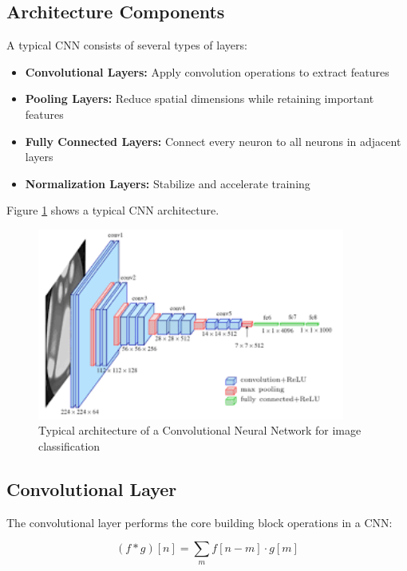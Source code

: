 \documentclass[11pt,a4paper]{report}
\begin{document}
\subsection{Architecture Components}
A typical CNN consists of several types of layers:

\begin{itemize}
    \item \textbf{Convolutional Layers:} Apply convolution operations to extract features
    \item \textbf{Pooling Layers:} Reduce spatial dimensions while retaining important features
    \item \textbf{Fully Connected Layers:} Connect every neuron to all neurons in adjacent layers
    \item \textbf{Normalization Layers:} Stabilize and accelerate training
\end{itemize}

Figure \ref{fig:cnn-architecture} shows a typical CNN architecture.

\begin{figure}[ht]
    \centering
    \includegraphics[width=0.9\textwidth]{cnn_architecture.png}
    \caption{Typical architecture of a Convolutional Neural Network for image classification}
    \label{fig:cnn-architecture}
\end{figure}

\subsection{Convolutional Layer}
The convolutional layer performs the core building block operations in a CNN:

\begin{equation}
(f * g)[n] = \sum_{m} f[n-m] \cdot g[m]
\end{equation}
\end{document}
